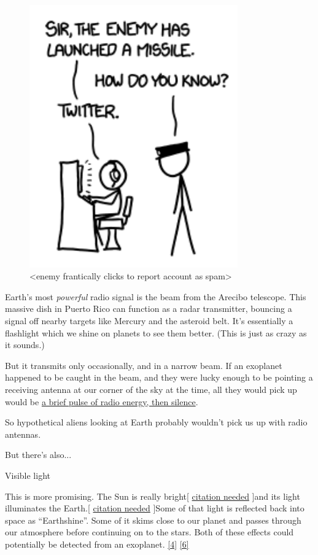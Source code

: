 {\begin{figure}[!htbp]
\centering
\includegraphics[scale=0.5, max width=0.8\textwidth]{imgs/a/47/life_twitter.png}
\caption{<enemy frantically clicks to report account as spam>}
\end{figure}

{Earth’s most \emph{powerful} radio signal is the beam from the Arecibo telescope. This massive dish in Puerto Rico can function as a radar transmitter, bouncing a signal off nearby targets like Mercury and the asteroid belt. It’s essentially a flashlight which we shine on planets to see them better. (This is just as crazy as it sounds.)}

{But it transmits only occasionally, and in a narrow beam. If an exoplanet happened to be caught in the beam, and they were lucky enough to be pointing a receiving antenna at our corner of the sky at the time, all they would pick up would be \href{http://en.wikipedia.org/wiki/Wow!\_signal}{a brief pulse of radio energy, then silence}.}

{So hypothetical aliens looking at Earth probably wouldn’t pick us up with radio antennas.}

{But there’s also...}

{Visible light}

{This is more promising. The Sun is really bright[{ \href{http://www.google.com/search?q=site:craigslist.org+chevrolet+citation}{citation needed}} ]and its light illuminates the Earth.[{ \href{http://en.wikipedia.org/wiki/Citation\_(horse)}{citation needed}} ]Some of that light is reflected back into space as “Earthshine”. Some of it skims close to our planet and passes through our atmosphere before continuing on to the stars. Both of these effects could potentially be detected from an exoplanet. \href{http://www.worldcat.org/title/earth-as-a-distant-planet-a-rosetta-stone-for-the-search-of-earth-like-worlds/oclc/6432}{[4]} \href{http://planetimager.org/} {[6]}}

}
